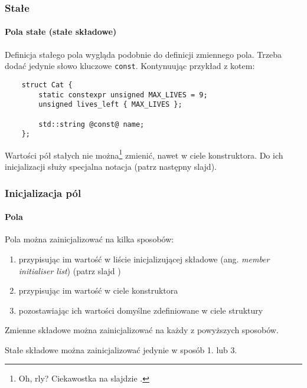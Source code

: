 \documentclass[aspectratio=169,10pt]{beamer}
\begin{document}
\begin{frame}[fragile]
    \frametitle{Stałe}
    \framesubtitle{Pola stałe (stałe składowe)}

    Definicja stałego pola wygląda podobnie do definicji zmiennego pola. Trzeba
    dodać jedynie słowo kluczowe \texttt{const}. Kontynuując przykład z kotem:

    {\scriptsize
    \begin{lstlisting}
    struct Cat {
        static constexpr unsigned MAX_LIVES = 9;
        unsigned lives_left { MAX_LIVES };

        std::string @const@ name;
    };
    \end{lstlisting}}

    Wartości pół stałych nie można\footnote{Oh, rly? Ciekawostka na slajdzie
    \pageref{hackerman_const_field_mutation}.} zmienić, nawet w ciele
    konstruktora. Do ich inicjalizacji służy specjalna notacja (patrz następny
    slajd).
\end{frame}

\begin{frame}
    \frametitle{Inicjalizacja pól}
    \framesubtitle{Pola}

    Pola można zainicjalizować na kilka sposobów:
    \begin{enumerate}
        \item przypisując im wartość w liście inicjalizującej składowe (ang.
            \emph{member initialiser list}) (patrz slajd
            \pageref{ctor_field_init_example})
        \item przypisując im wartość w ciele konstruktora
        \item pozostawiając ich wartości domyślne zdefiniowane w ciele struktury
    \end{enumerate}

    \vspace{1em}

    Zmienne składowe można zainicjalizować na każdy z powyższych sposobów.

    Stałe składowe można zainicjalizować jedynie w sposób 1. lub 3.
\end{frame}
\end{document}
